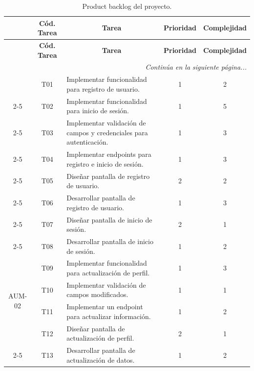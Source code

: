 \begin{longtable}[c]{|c|c|m{}|c|c|}
    \caption{Product backlog del proyecto.}
    \label{tab:productBacklog} \\
    \hline
    \rowcolor{gray!50}
    \multicolumn{1}{|c|}{\textbf{Cód. HU}} & \multicolumn{1}{|c|}{\textbf{Cód. Tarea}} & \multicolumn{1}{|c|}{\textbf{Tarea}} & \multicolumn{1}{c|}{\textbf{Prioridad}} & \multicolumn{1}{c|}{\textbf{Complejidad}} \\
    \hline
    \endfirsthead
    
    \hline
    \rowcolor{gray!50}
    \multicolumn{1}{|c|}{\textbf{Cód. HU}} & \multicolumn{1}{|c|}{\textbf{Cód. Tarea}} & \multicolumn{1}{|c|}{\textbf{Tarea}} & \multicolumn{1}{c|}{\textbf{Prioridad}} & \multicolumn{1}{c|}{\textbf{Complejidad}} \\
    \hline
    \endhead
    
    \multicolumn{5}{r}{\textit{Continúa en la siguiente página...}} \\
    \endfoot
    
    \endlastfoot
    

    \multirow{8}{*}{AUM-01} & T01 & Implementar funcionalidad para registro de usuario. & 1 & 2 \\
    \cline{2-5}
     & T02 & Implementar funcionalidad para inicio de sesión. & 1 & 5 \\
    \cline{2-5}
     & T03 & Implementar validación de campos y credenciales para autenticación. & 1 & 3 \\
    \cline{2-5}
     & T04 & Implementar endpoints para registro e inicio de sesión. & 1 & 3 \\
    \cline{2-5}
     & T05 & Diseñar pantalla de registro de usuario. & 2 & 2 \\
    \cline{2-5}
     & T06 & Desarrollar pantalla de registro de usuario. & 1 & 3 \\
    \cline{2-5}
     & T07 & Diseñar pantalla de inicio de sesión. & 2 & 1 \\
    \cline{2-5}
     & T08 & Desarrollar pantalla de inicio de sesión. & 1 & 2 \\
    \hline
    
    \multirow{4}{*}{AUM-02} & T09 & Implementar funcionalidad para actualización de perfil. & 1 & 3 \\
    \cline{2-5}
     & T10 & Implementar validación de campos modificados. & 1 & 1 \\
    \cline{2-5}
     & T11 & Implementar un endpoint para actualizar información. & 1 & 2 \\
    \cline{2-5}
     & T12 & Diseñar pantalla de actualización de perfil. & 2 & 1 \\
    \cline{2-5}
     & T13 & Desarrollar pantalla de actualización de datos. & 1 & 2 \\
    \hline
    

\end{longtable}
